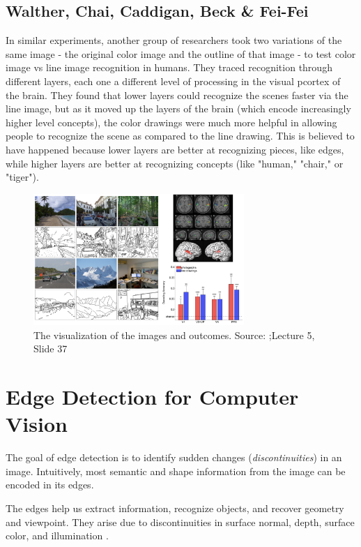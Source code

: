 \documentclass{article}
\begin{document}
\subsection{Walther, Chai, Caddigan, Beck \& Fei-Fei}
In similar experiments, another group of researchers took two variations of the same image - the original color image and the outline of that image - to test color image vs line image recognition in humans. They traced recognition through different layers, each one a different level of processing in the visual pcortex of the brain. They found that lower layers could recognize the scenes faster via the line image, but as it moved up the layers of the brain (which encode increasingly higher level concepts), the color drawings were much more helpful in allowing people to recognize the scene as compared to the line drawing. This is believed to have happened because lower layers are better at recognizing pieces, like edges, while higher layers are better at recognizing concepts (like "human," "chair," or "tiger").

\begin{figure}[H]
\centering
\includegraphics[width=8cm]{fei-fei_images.png}
\caption{The visualization of the images and outcomes. Source: \cite{walther2011simple};Lecture 5, Slide 37}
\end{figure}


\section{Edge Detection for Computer Vision}
The goal of edge detection is to identify sudden changes (\textit{discontinuities}) in an image. Intuitively, most semantic and shape information from the image can be encoded in its edges. \newline

The edges help us extract information, recognize objects, and recover geometry and viewpoint. They arise due to discontinuities in surface normal, depth, surface color, and illumination . \newline
\end{document}

